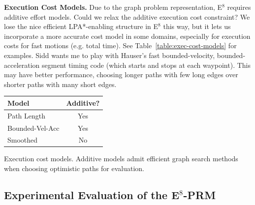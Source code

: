 \textbf{Execution Cost Models.}
Due to the graph problem representation,
E$^8$ requires additive effort models.
Could we relax the additive execution cost constraint?
We lose the nice efficient LPA*-enabling structure in
E$^8$ this way,
but it lets us incorporate a more accurate cost model in some domains,
especially for execution costs for fast motions (e.g. total time).
See Table~\ref{table:exec-cost-models} for examples.
Sidd wants me to play with Hauser's fast bounded-velocity,
bounded-acceleration segment timing code
(which starts and stops at each waypoint).
This may have better performance,
choosing longer paths with few long edges over
shorter paths with many short edges.

\begin{margintable}
   \centering
   \begin{tabular}{lc}
      \toprule
      Model & Additive? \\
      \midrule
      Path Length & Yes \\
      Bounded-Vel-Acc & Yes \\
      Smoothed & No \\
      \bottomrule
   \end{tabular}
   \vspace{0.1in}
   \caption{Execution cost models.
      Additive models admit efficient graph search methods
      when choosing optimistic paths for evaluation.}
   \label{table:exec-cost-models}
\end{margintable}

\subsection{Experimental Evaluation of the E$^8$-PRM}
\label{subsec:single-query-results}

